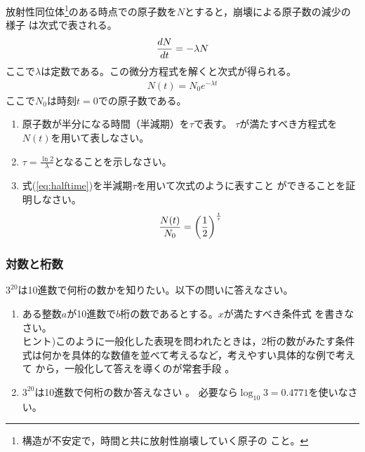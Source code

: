 \documentclass[twocolumn,11pt]{jarticle}
\begin{document}
\nquestion
放射性同位体\footnote{構造が不安定で，時間と共に放射性崩壊していく原子の
  こと。}のある時点での原子数を$N$とすると，崩壊による原子数の減少の様子
は次式で表される。
\begin{align}
  \frac{dN}{dt}=-\lambda N\notag
\end{align}
ここで$\lambda$は定数である。この微分方程式を解くと次式が得られる。
\begin{align}
  \label{eq:halftime}
  N(t)=N_0e^{-\lambda t}
\end{align}
ここで$N_0$は時刻$t=0$での原子数である。

\begin{enumerate}
\item
 原子数が半分になる時間（半減期）を$\tau$で表す。
 $\tau$が満たすべき方程式を$N(t)$を用いて表しなさい。
\item
  $\tau=\displaystyle\frac{\ln 2}{\lambda}$となることを示しなさい。
\item
 式(\ref{eq:halftime})を半減期$\tau$を用いて次式のように表すこと
  ができることを証明しなさい。
  \begin{align}
    \frac{N(t)}{N_0}=\left(\frac{1}{2}\right)^{\frac{t}{\tau}}\notag
  \end{align}
\end{enumerate}


\subsubsection{対数と桁数}
\nquestion
$3^{20}$は10進数で何桁の数かを知りたい。以下の問いに答えなさい。
\begin{enumerate}
\item ある整数$a$が10進数で$b$桁の数であるとする。$x$が満たすべき条件式
  を書きなさい。\\
ヒント)このように一般化した表現を問われたときは，2桁の数がみたす条件
式は何かを具体的な数値を並べて考えるなど，考えやすい具体的な例で考えて
から，一般化して答えを導くのが常套手段
  。
\item $3^{20}$は10進数で何桁の数か答えなさい
。
必要なら$\log_{10}3=0.4771$を使いなさい。
\end{enumerate}

\end{document}
